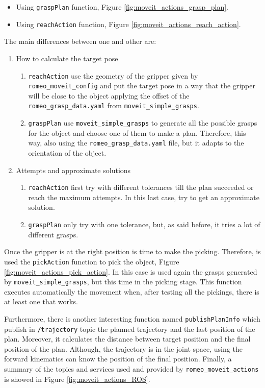 \documentclass[12pt,a4paper,final,twoside,openright]{report}
\begin{document}
\begin{itemize}
\item Using \texttt{graspPlan} function, Figure \ref{fig:moveit_actions_grasp_plan}.
\item Using \texttt{reachAction} function, Figure \ref{fig:moveit_actions_reach_action}.
\end{itemize}

The main differences between one and other are: 
\begin{enumerate}
\item How to calculate the target pose 
\begin{enumerate}
\item \texttt{reachAction} use the geometry of the gripper given by \texttt{romeo\_moveit\_config} and put the target pose in a way that the gripper will be close to the object applying the offset of the \texttt{romeo\_grasp\_data.yaml} from \texttt{moveit\_simple\_grasps}. 
\item \texttt{graspPlan} use \texttt{moveit\_simple\_grasps} to generate all the possible grasps for the object and choose one of them to make a plan. Therefore, this way, also using the \texttt{romeo\_grasp\_data.yaml} file, but it adapts to the orientation of the object. 
\end{enumerate}

\item Attempts and approximate solutions
\begin{enumerate}
\item \texttt{reachAction} first try with different tolerances till the plan succeeded or reach the maximum attempts. In this last case, try to get an approximate solution.
\item \texttt{graspPlan} only try with one tolerance, but, as said before, it tries a lot of different grasps.
\end{enumerate}
\end{enumerate}

Once the gripper is at the right position is time to make the picking. Therefore, is used the \texttt{pickAction} function to pick the object, Figure \ref{fig:moveit_actions_pick_action}. In this case is used again the grasps generated by \texttt{moveit\_simple\_grasps}, but this time in the picking stage. This function executes automatically the movement when, after testing all the pickings, there is at least one that works.

Furthermore, there is another interesting function named \texttt{publishPlanInfo} which publish in \texttt{/trajectory} topic the planned trajectory and the last position of the plan. Moreover, it calculates the distance between target position and the final position of the plan. Although, the trajectory is in the joint space, using the forward kinematics can know the position of the final position. Finally, a summary of the topics and services used and provided by \texttt{romeo\_moveit\_actions} is showed in Figure \ref{fig:moveit_actions_ROS}. 
\end{document}

